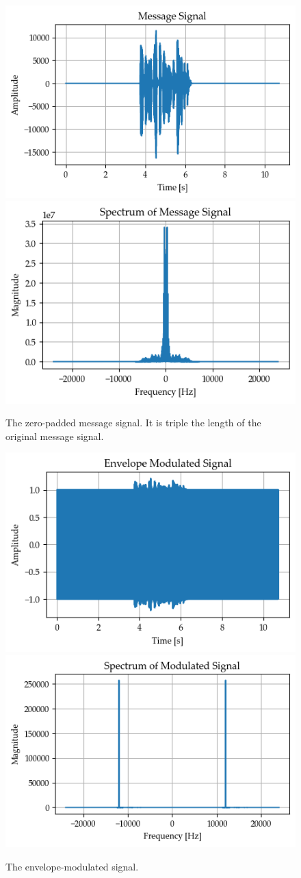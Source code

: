 \documentclass[../ECE459FinalProjectReport.tex]{subfiles}
\begin{document}
\begin{figure}[b]
    \centering
    \includegraphics[width=0.49\linewidth]{plots/am/message_time.png}
    \includegraphics[width=0.49\linewidth]{plots/am/message_spectrum.png}
    \caption{The zero-padded message signal. It is triple the length of the original message signal.}
    \label{fig:am-long-message}
\end{figure}
\begin{figure}[b]
    \centering
    \includegraphics[width=0.49\linewidth]{plots/am/modulated_time.png}
    \includegraphics[width=0.49\linewidth]{plots/am/modulated_spectrum.png}
    \caption{The envelope-modulated signal.}
    \label{fig:am-modulated}
\end{figure}
\end{document}
